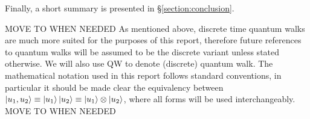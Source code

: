 Finally, a short summary is presented in \S{\ref{section:conclusion}}.\newline

MOVE TO WHEN NEEDED
As mentioned above, discrete time quantum walks are much more suited for the purposes of this report, therefore future references to quantum walks will be assumed to be the discrete variant unless stated otherwise. 
We will also use QW to denote (discrete) quantum walk. 
The mathematical notation used in this report follows standard conventions, in particular it should be made clear the equivalency between $\ket{u_1, u_2}\equiv\ket{u_1}\ket{u_2} \equiv \ket{u_1} \otimes \ket{u_2}$, where all forms will be used interchangeably.
MOVE TO WHEN NEEDED